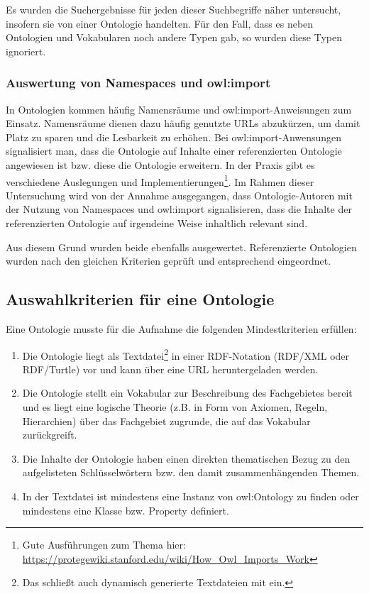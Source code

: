 \documentclass{article}
\begin{document}
Es wurden die Suchergebnisse für jeden dieser Suchbegriffe näher untersucht, insofern sie von einer Ontologie handelten.
Für den Fall, dass es neben Ontologien und Vokabularen noch andere Typen gab, so wurden diese Typen ignoriert.

\subsubsection{Auswertung von Namespaces und owl:import}

In Ontologien kommen häufig Namensräume und owl:import-Anweisungen zum Einsatz.
Namensräume dienen dazu häufig genutzte URLs abzukürzen, um damit Platz zu sparen und die Lesbarkeit zu erhöhen.
Bei owl:import-Anwensungen signalisiert man, dass die Ontologie auf Inhalte einer referenzierten Ontologie angewiesen ist bzw. diese die Ontologie erweitern.
In der Praxis gibt es verschiedene Auslegungen und Implementierungen\footnote{Gute Ausführungen zum Thema hier: \url{https://protegewiki.stanford.edu/wiki/How_Owl_Imports_Work}}.
Im Rahmen dieser Untersuchung wird von der Annahme ausgegangen, dass Ontologie-Autoren mit der Nutzung von Namespaces und owl:import signalisieren, dass die Inhalte der referenzierten Ontologie auf irgendeine Weise inhaltlich relevant sind.

Aus diesem Grund wurden beide ebenfalls ausgewertet.
Referenzierte Ontologien wurden nach den gleichen Kriterien geprüft und entsprechend eingeordnet.

\subsection{Auswahlkriterien für eine Ontologie}

Eine Ontologie musste für die Aufnahme die folgenden Mindestkriterien erfüllen:

\begin{enumerate}
    \item Die Ontologie liegt als Textdatei\footnote{Das schließt auch dynamisch generierte Textdateien mit ein.} in einer RDF-Notation (RDF/XML oder RDF/Turtle) vor und kann über eine URL heruntergeladen werden.
    \item Die Ontologie stellt ein Vokabular zur Beschreibung des Fachgebietes bereit und es liegt eine logische Theorie (z.B. in Form von Axiomen, Regeln, Hierarchien) über das Fachgebiet zugrunde, die auf das Vokabular zurückgreift.
    \item Die Inhalte der Ontologie haben einen direkten thematischen Bezug zu den aufgelisteten Schlüsselwörtern bzw. den damit zusammenhängenden Themen.
    \item In der Textdatei ist mindestens eine Instanz von owl:Ontology zu finden oder mindestens eine Klasse bzw. Property definiert.
\end{enumerate}
\end{document}
